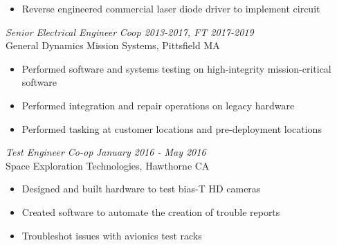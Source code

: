 \documentclass[line,mmmargin]{res}
\begin{document}
\begin{resume}
\begin{itemize}
		\item Reverse engineered commercial laser diode driver to
			implement circuit
	\end{itemize}
	\vspace{-10pt}
    {\sl Senior Electrical Engineer } \hfill
{\sl Coop 2013-2017, FT 2017-2019}\\
	General Dynamics Mission Systems, Pittsfield MA
	\begin{itemize}  \itemsep -2pt %
		\item Performed software and systems testing on high-integrity mission-critical software
		\item Performed integration and repair operations on legacy hardware
		\item Performed tasking at customer locations and pre-deployment locations
	\end{itemize}
	\vspace{-10pt}
{\sl  Test Engineer Co-op} \hfill {\sl January 2016 - May 2016}\\
	Space Exploration Technologies, Hawthorne CA
	\begin{itemize}  \itemsep -2pt %
		\item Designed and built hardware to test bias-T HD cameras
		\item Created software to automate the creation of trouble reports
		\item Troubleshot issues with avionics test racks
	\end{itemize}
 

\end{resume}
\end{document}
